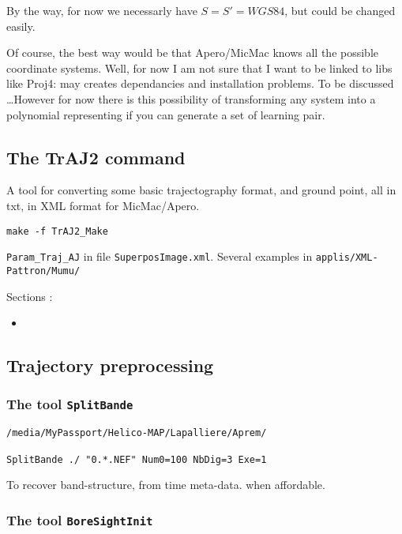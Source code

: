 By the way, for now we necessarly have $S=S'=WGS84$, but could be changed easily.


Of course, the best way would be that Apero/MicMac knows all the possible coordinate systems.
Well, for now I am not sure that I want to be linked to libs like Proj4: may
creates dependancies and installation problems. To be discussed \dots However
for now there is this possibility of transforming any system into a polynomial
representing if you can generate a set of learning pair.


\subsection{The TrAJ2 command}

A tool for converting some basic trajectography format, and ground point,
all in txt, in XML format for MicMac/Apero.


{\tt make -f TrAJ2\_Make}

{\tt Param\_Traj\_AJ} in file {\tt SuperposImage.xml}. Several examples in
{\tt applis/XML-Pattron/Mumu/}



Sections :

\begin{itemize}
   \item
\end{itemize}


\subsection{Trajectory preprocessing}

\subsubsection{The tool {\tt SplitBande}}


\begin{verbatim}
/media/MyPassport/Helico-MAP/Lapalliere/Aprem/

SplitBande ./ "0.*.NEF" Num0=100 NbDig=3 Exe=1
\end{verbatim}





To recover band-structure, from time meta-data. when affordable.


\subsubsection{The tool {\tt BoreSightInit}}











